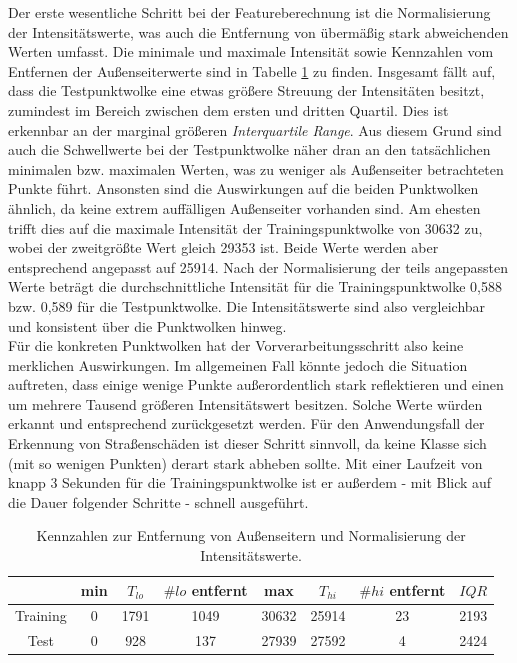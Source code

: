 Der erste wesentliche Schritt bei der Featureberechnung ist die Normalisierung der Intensitätswerte, was auch die Entfernung von übermäßig stark abweichenden Werten umfasst. Die minimale und maximale Intensität sowie Kennzahlen vom Entfernen der Außenseiterwerte sind in Tabelle \ref{table:intensity_preproc} zu finden. Insgesamt fällt auf, dass die Testpunktwolke eine etwas größere Streuung der Intensitäten besitzt, zumindest im Bereich zwischen dem ersten und dritten Quartil. Dies ist erkennbar an der marginal größeren \textit{Interquartile Range}. Aus diesem Grund sind auch die Schwellwerte bei der Testpunktwolke näher dran an den tatsächlichen minimalen bzw. maximalen Werten, was zu weniger als Außenseiter betrachteten Punkte führt. Ansonsten sind die Auswirkungen auf die beiden Punktwolken ähnlich, da keine extrem auffälligen Außenseiter vorhanden sind. Am ehesten trifft dies auf die maximale Intensität der Trainingspunktwolke von 30632 zu, wobei der zweitgrößte Wert gleich 29353 ist. Beide Werte werden aber entsprechend angepasst auf 25914. Nach der Normalisierung der teils angepassten Werte beträgt die durchschnittliche Intensität für die Trainingspunktwolke 0,588 bzw. 0,589 für die Testpunktwolke. Die Intensitätswerte sind also vergleichbar und konsistent über die Punktwolken hinweg. \\
Für die konkreten Punktwolken hat der Vorverarbeitungsschritt also keine merklichen Auswirkungen. Im allgemeinen Fall könnte jedoch die Situation auftreten, dass einige wenige Punkte außerordentlich stark reflektieren und einen um mehrere Tausend größeren Intensitätswert besitzen. Solche Werte würden erkannt und entsprechend zurückgesetzt werden. Für den Anwendungsfall der Erkennung von Straßenschäden ist dieser Schritt sinnvoll, da keine Klasse sich (mit so wenigen Punkten) derart stark abheben sollte. Mit einer Laufzeit von knapp 3 Sekunden für die Trainingspunktwolke ist er außerdem - mit Blick auf die Dauer folgender Schritte - schnell ausgeführt.

\begin{table}
\centering
\begin{tabular}{c|c|c|c|c|c|c|c}
 & min & $T_{lo}$ & $\# lo$ entfernt & max & $T_{hi}$ & $\# hi$ entfernt & $IQR$ \\
\hline
Training   & 0 & 1791 & 1049 & 30632 & 25914 & 23 & 2193 \\
Test       & 0 & 928 & 137 & 27939 & 27592 & 4 & 2424 \\
\end{tabular}
\caption{Kennzahlen zur Entfernung von Außenseitern und Normalisierung der Intensitätswerte.}
\label{table:intensity_preproc}
\end{table}

